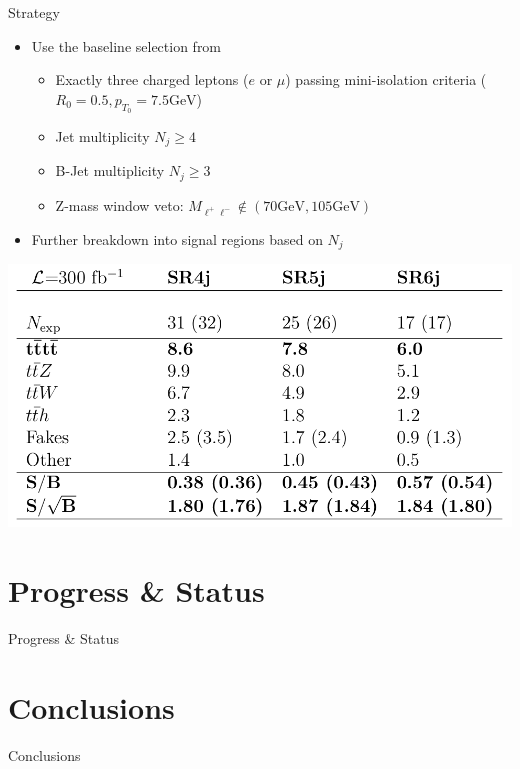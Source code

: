 \documentclass[english,aspectratio=169]{beamer}
\newcommand{\GeV}{\si{\giga\electronvolt}}
\begin{document}
\begin{frame}{Strategy}
  \begin{minipage}[c][\textheight]{0.49\textwidth}
    \small
    \begin{itemize}
      \item Use the baseline selection from\cite{}
      \begin{itemize}
        \item Exactly three charged leptons ($e$ or $\mu$) passing mini-isolation criteria ($R_0=0.5, p_{T_0}=7.5\GeV$)
        \item Jet multiplicity $N_j \ge 4$
        \item B-Jet multiplicity $N_j \ge 3$
        \item Z-mass window veto: $M_{\ell^+\ell^-} \notin (70\GeV,105\GeV)$
      \end{itemize}
      \item Further breakdown into signal regions based on $N_j$
    \end{itemize}
  \end{minipage}
  \begin{minipage}[c][\textheight]{0.49\textwidth}
    \begin{center}
      \includegraphics[width=\textwidth]{figures/event-yields}
    \end{center}
  \end{minipage}
\end{frame}


\section{Progress \& Status}
\begin{frame}{Progress \& Status}
\end{frame}

\section{Conclusions}
\begin{frame}{Conclusions}
\end{frame}
\end{document}
